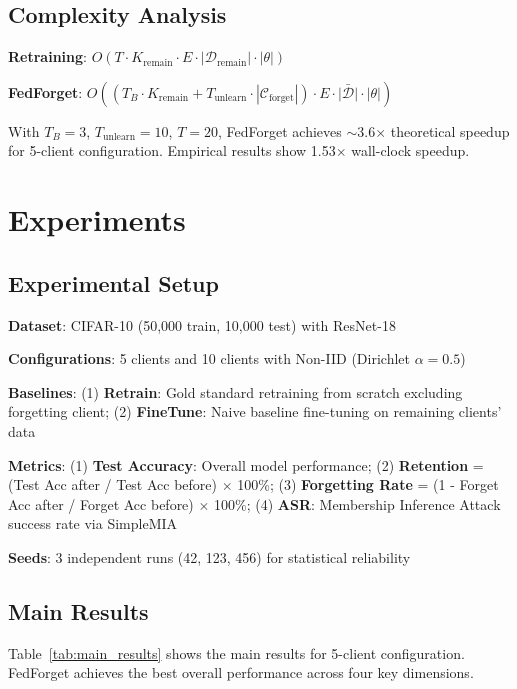 \documentclass[10pt,twocolumn]{article}
\begin{document}
\subsection{Complexity Analysis}

\textbf{Retraining}: $O(T \cdot K_{\text{remain}} \cdot E \cdot |\mathcal{D}_{\text{remain}}| \cdot |\theta|)$

\textbf{FedForget}: $O((T_B \cdot K_{\text{remain}} + T_{\text{unlearn}} \cdot |\mathcal{C}_{\text{forget}}|) \cdot E \cdot \bar{|\mathcal{D}|} \cdot |\theta|)$

With $T_B = 3$, $T_{\text{unlearn}} = 10$, $T = 20$, FedForget achieves $\sim$3.6$\times$ theoretical speedup for 5-client configuration. Empirical results show 1.53$\times$ wall-clock speedup.

\section{Experiments}

\subsection{Experimental Setup}

\textbf{Dataset}: CIFAR-10 (50,000 train, 10,000 test) with ResNet-18 \cite{he2016deep}

\textbf{Configurations}: 5 clients and 10 clients with Non-IID (Dirichlet $\alpha=0.5$)

\textbf{Baselines}: (1) \textbf{Retrain}: Gold standard retraining from scratch excluding forgetting client; (2) \textbf{FineTune}: Naive baseline fine-tuning on remaining clients' data

\textbf{Metrics}: (1) \textbf{Test Accuracy}: Overall model performance; (2) \textbf{Retention} = (Test Acc after / Test Acc before) $\times$ 100\%; (3) \textbf{Forgetting Rate} = (1 - Forget Acc after / Forget Acc before) $\times$ 100\%; (4) \textbf{ASR}: Membership Inference Attack success rate via SimpleMIA

\textbf{Seeds}: 3 independent runs (42, 123, 456) for statistical reliability

\subsection{Main Results}

Table~\ref{tab:main_results} shows the main results for 5-client configuration. FedForget achieves the best overall performance across four key dimensions.
\end{document}
